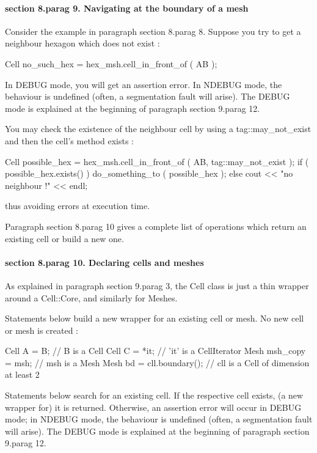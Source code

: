 \paragraph{\numb section 8.\numb parag 9. Navigating at the boundary of a mesh}

Consider the example in paragraph \numb section 8.\numb parag 8.
Suppose you try to get a neighbour hexagon which does not exist :

\verbatim
   Cell no_such_hex = hex_msh.cell_in_front_of ( AB );
\endverbatim

In {\codett DEBUG} mode, you will get an {\codett assertion error}.
In {\codett NDEBUG} mode, the behaviour is undefined
(often, a {\codett segmentation fault} will arise).
The {\codett DEBUG} mode is explained at the beginning of paragraph \numb section
9.\numb parag 12.

You may check the existence of the neighbour cell by using a
{\codett tag::may\_not\_exist} and then the cell's method {\codett exists} :

\verbatim
   Cell possible_hex = hex_msh.cell_in_front_of ( AB, tag::may_not_exist );
   if ( possible_hex.exists() ) do_something_to ( possible_hex );
   else cout << "no neighbour !" << endl;
\endverbatim

\noindent thus avoiding errors at execution time.

Paragraph \numb section 8.\numb parag 10 gives a complete list of operations which return
an existing cell or build a new one.


\paragraph{\numb section 8.\numb parag 10. Declaring cells and meshes}

As explained in paragraph \numb section 9.\numb parag 3, the {\codett Cell} class
is just a thin wrapper around a {\codett Cell::Core}, and similarly for {\codett Mesh}es.

Statements below build a new wrapper for an existing cell or mesh.
No new cell or mesh is created :

\verbatim
   Cell A = B;  // B is a Cell
   Cell C = *it;  // 'it' is a CellIterator
   Mesh msh_copy = msh;  // msh is a Mesh
   Mesh bd = cll.boundary();  // cll is a Cell of dimension at least 2
\endverbatim

Statements below search for an existing cell.
If the respective cell exists, (a new wrapper for) it is returned.
Otherwise, an {\codett assertion error} will occur in {\codett DEBUG} mode;
in {\codett NDEBUG} mode, the behaviour is undefined (often, a {\codett segmentation fault}
will arise).
The {\codett DEBUG} mode is explained at the beginning of paragraph \numb section
9.\numb parag 12.

